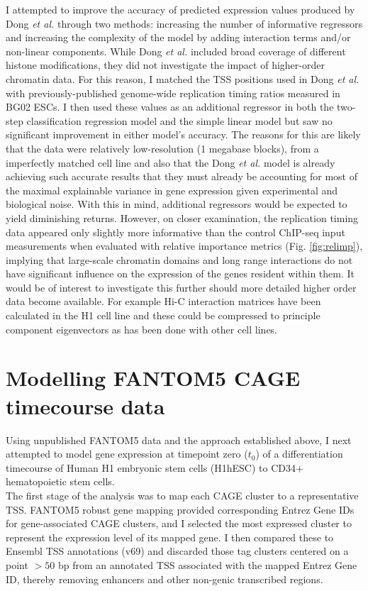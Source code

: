 \documentclass[a4paper]{report}
\begin{document}
I attempted to improve the accuracy of predicted expression values
produced by Dong \emph{et al.} through two methods: increasing the number of informative
regressors and increasing the complexity of the model by adding
interaction terms and/or non-linear components. While Dong \emph{et
  al.} included broad coverage of different histone modifications,
they did not investigate the impact of higher-order
chromatin data. For this reason, I matched the TSS positions used in
Dong \emph{et al.} with previously-published genome-wide replication
timing ratios measured in BG02 ESCs.\cite{Ryba2010} I then used these values as an additional
regressor in both the two-step classification regression model and the
simple linear model but saw no significant improvement in either
model's accuracy. The reasons for this are likely that the 
data were relatively low-resolution (1 megabase blocks), from a
imperfectly matched cell line and also that
the Dong \emph{et al.} model is already achieving such accurate
results that they must already be accounting for most of the maximal
explainable variance in gene expression given experimental and
biological noise. With this in mind, additional regressors would be
expected to yield diminishing returns. However, on closer examination,
the replication timing data
appeared only slightly more informative than the control ChIP-seq input
measurements when evaluated with relative importance metrics
(Fig. \ref{fig:relimp}), implying that large-scale chromatin domains
and long range interactions
do not have significant influence on the expression of the genes resident within them. It would
be of interest to investigate this further should more detailed higher order
data become available. For example Hi-C interaction matrices have been
calculated in the H1 cell line\cite{Dixon2012} and these could be
compressed to principle component eigenvectors as has been done with
other cell lines.\cite{Lieberman2011}

\section*{Modelling FANTOM5 CAGE timecourse data}
Using unpublished FANTOM5 data and the approach established above, I next attempted to model gene
expression at timepoint zero ($t_0$) of a differentiation timecourse of Human
H1 embryonic stem cells (H1hESC) to CD34+ hematopoietic stem
cells. \\

The first stage of the analysis was to map each CAGE cluster to a
representative TSS. FANTOM5 robust gene mapping\cite{fantom5}
provided corresponding Entrez Gene IDs for gene-associated CAGE
clusters, and I selected the most expressed cluster to represent the
expression level of its mapped gene. I then compared these to Ensembl
TSS annotations (v69) and
discarded those tag clusters centered on a point $>50$ bp from an annotated
TSS associated with the mapped Entrez Gene ID, thereby removing enhancers and other non-genic transcribed
regions. \\
\end{document}
